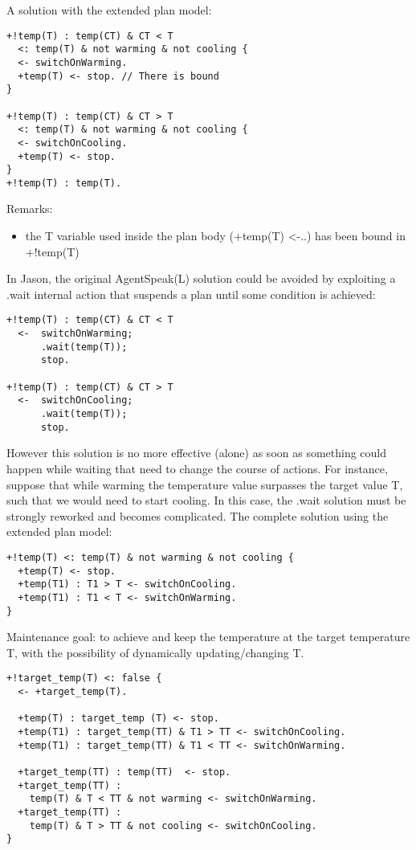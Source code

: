 A solution with the extended plan model:

{\small
\begin{verbatim}
+!temp(T) : temp(CT) & CT < T 
  <: temp(T) & not warming & not cooling {  
  <- switchOnWarming.
  +temp(T) <- stop. // There is bound	
}

+!temp(T) : temp(CT) & CT > T 
  <: temp(T) & not warming & not cooling {  
  <- switchOnCooling.	
  +temp(T) <- stop.		
}
+!temp(T) : temp(T).
\end{verbatim}}

Remarks:
\begin{itemize}
\item the T variable used inside the plan body (+temp(T) <-..) has been bound in +!temp(T)
\end{itemize}

\noindent  In Jason, the original AgentSpeak(L) solution could be avoided  by exploiting a .wait internal action that suspends a plan until some condition is achieved:

{\small
\begin{verbatim}
+!temp(T) : temp(CT) & CT < T 
  <-  switchOnWarming;
      .wait(temp(T));
      stop.

+!temp(T) : temp(CT) & CT > T 
  <-  switchOnCooling;
      .wait(temp(T));
      stop.
\end{verbatim}}

\noindent However this solution is no more effective (alone) as soon as something could happen while waiting that need to change the course of actions.  
%
For instance, suppose that while warming the temperature value surpasses the target value T, such that we would need to start cooling. In this case, the .wait solution must be strongly reworked and becomes complicated.
%
The complete solution using the extended plan model:

{\small
\begin{verbatim}
+!temp(T) <: temp(T) & not warming & not cooling {
  +temp(T) <- stop.		
  +temp(T1) : T1 > T <- switchOnCooling.	
  +temp(T1) : T1 < T <- switchOnWarming.		
}\end{verbatim}}


\noindent Maintenance goal: to achieve and keep the temperature at the target temperature T, with the possibility of dynamically updating/changing T.

{\small
\begin{verbatim}
+!target_temp(T) <: false {
  <- +target_temp(T).	
 
  +temp(T) : target_temp (T) <- stop.		
  +temp(T1) : target_temp(TT) & T1 > TT <- switchOnCooling.	  
  +temp(T1) : target_temp(TT) & T1 < TT <- switchOnWarming.
 
  +target_temp(TT) : temp(TT)  <- stop.	
  +target_temp(TT) : 
    temp(T) & T < TT & not warming <- switchOnWarming.
  +target_temp(TT) : 
    temp(T) & T > TT & not cooling <- switchOnCooling.
}
\end{verbatim}}

